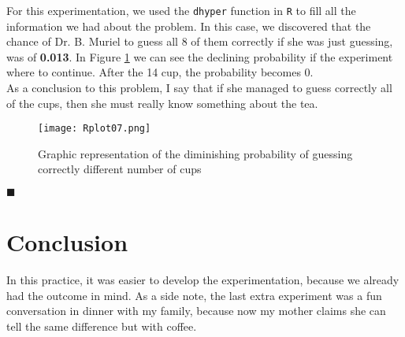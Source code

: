 \documentclass{article}
\begin{document}
For this experimentation, we used the \texttt{dhyper} function in \texttt{R} to fill all the information we had about the problem. In this case, we discovered that the chance of Dr. B. Muriel to guess all 8 of them correctly if she was just guessing, was of \textbf{0.013}. In Figure \ref{fig9} we can see the declining probability if the experiment where to continue. After the 14 cup, the probability becomes 0.\\

As a conclusion to this problem, I say that if she managed to guess correctly all of the cups, then she must really know something about the tea. \\

\begin{figure}[]
  \centering
  \texttt{[image: Rplot07.png]}  
	\caption{Graphic representation of the diminishing probability of guessing correctly different number of cups }
\label{fig9}
\end{figure}

\begin{flushright}
$\blacksquare$
\end{flushright}

\section{Conclusion}

In this practice, it was easier to develop the experimentation, because we already had the outcome in mind. As a side note, the last extra experiment was a fun conversation in dinner with my family, because now my mother claims she can tell the same difference but with coffee.\\





 
\end{document}
